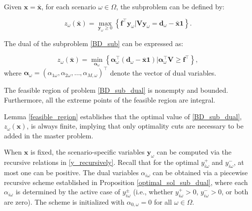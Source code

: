 Given $\mathbf{x} = \mathbf{\bar{x}}$, for each scenario $\omega \in \Omega$, the subproblem can be defined by:

\begin{equation}\label{BD_sub}
  z_{\omega}(\mathbf{\bar{x}}) = \max_{\mathbf{y}_{\omega} \geq 0} \left\{
  \mathbf{f}^{\intercal} \mathbf{y}_{\omega}\Big| \mathbf{V} \mathbf{y}_{\omega} = \mathbf{d}_{\omega} - \mathbf{\bar{x}} \mathbf{1}
  \right\}.
\end{equation}


The dual of the subproblem \eqref{BD_sub} can be expressed as:

\begin{equation}\label{BD_sub_dual}
  z_{\omega}(\mathbf{\bar{x}}) = \min_{\bm{\alpha}_{\omega}} \left\{
    \bm{\alpha}_{\omega}^{\intercal} (\mathbf{d}_{\omega}- \mathbf{\bar{x}} \mathbf{1})\Big| \bm{\alpha}_{\omega}^{\intercal} \mathbf{V} \geq \mathbf{f}^{\intercal}
  \right\},
\end{equation}
where $\bm{\alpha}_{\omega} = (\alpha_{1\omega},\alpha_{2\omega}, \ldots, \alpha_{M,\omega})^{\intercal}$ denote the vector of dual variables. 

\begin{lem}\label{feasible_region}
  The feasible region of problem \eqref{BD_sub_dual} is nonempty and bounded. Furthermore, all the extreme points of the feasible region are integral.
 \end{lem}
 
Lemma \ref{feasible_region} establishes that the optimal value of \eqref{BD_sub_dual}, $z_{\omega}(\mathbf{x})$, is always finite, implying that only optimality cuts are necessary to be added in the master problem.

When $\mathbf{x}$ is fixed, the scenario-specific variables $\mathbf{y}_{\omega}$ can be computed via the recursive relations in \eqref{y_recursively}. Recall that for the optimal $y_{i \omega}^{+}$ and $y_{i \omega}^{-}$, at most one can be positive. The dual variables $\alpha_{i \omega}$ can be obtained via a piecewise recursive scheme established in Proposition \ref{optimal_sol_sub_dual}, where each $\alpha_{i \omega}$ is determined by the active case of $y_{i \omega}^{\pm}$ (i.e., whether $y_{i \omega}^{+}>0$, $y_{i \omega}^{-}>0$, or both are zero). The scheme is initialized with $\alpha_{0, \omega} = 0$ for all $\omega \in \Omega$.
 

